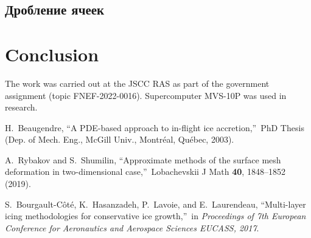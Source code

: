 \documentclass[
11pt,%
tightenlines,%
twoside,%
onecolumn,%
nofloats,%
nobibnotes,%
nofootinbib,%
superscriptaddress,%
noshowpacs,%
centertags]%
{revtex4}
\begin{document}
\subsection{Дробление ячеек}



\section{Conclusion}


\begin{acknowledgments}
The work was carried out at the JSCC RAS as part of the government assignment (topic FNEF-2022-0016). Supercomputer MVS-10P was used in research.
\end{acknowledgments}


\begin{thebibliography}{99}



H.~Beaugendre, \textquotedblleft A PDE-based approach to in-flight ice accretion,\textquotedblright \ PhD Thesis (Dep. of Mech. Eng., McGill Univ., Montr\'eal, Qu\'ebec, 2003).

A.~Rybakov and S.~Shumilin, \textquotedblleft Approximate methods of the surface mesh deformation in two-dimensional case,\textquotedblright \ Lobachevskii J Math {\bf 40}, 1848--1852 (2019).

S.~Bourgault-C\^ot\'e, K.~Hasanzadeh, P.~Lavoie, and E.~Laurendeau, \textquotedblleft Multi-layer icing methodologies for conservative ice growth,\textquotedblright \ in \textit{Proceedings of 7th European Conference for Aeronautics and Aerospace Sciences EUCASS, 2017}.

\end{thebibliography}
\end{document}
